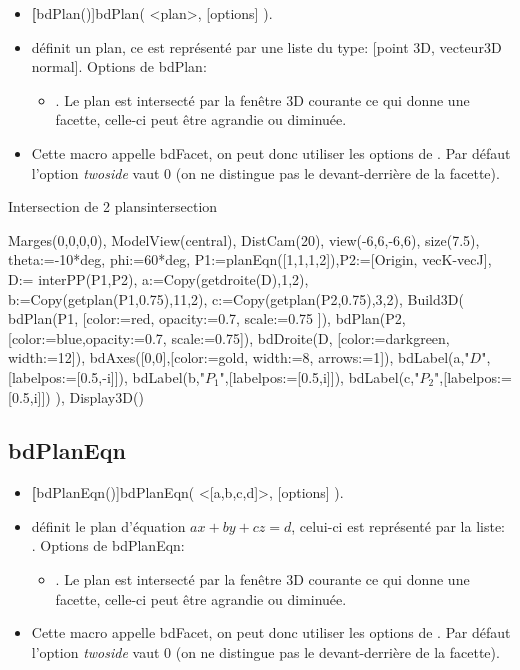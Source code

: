 \begin{itemize}
 \item \util \textbf[bdPlan()]{bdPlan( <plan>, [options] )}.
 \item \desc définit un plan, ce  est représenté par une liste du type: [point 3D, vecteur3D normal]. Options de bdPlan: 

  \begin{itemize}
  \item {}. Le plan est intersecté par la fenêtre 3D courante ce qui donne une facette, celle-ci peut être agrandie ou diminuée.
  \end{itemize}
 \item Cette macro appelle bdFacet, on peut donc utiliser les options de . Par défaut l'option \textit{twoside} vaut 0 (on ne distingue pas le devant-derrière de la facette).
\end{itemize}

\begin{demo}{Intersection de 2 plans}{intersection}
\begin{texgraph}[name=intersection]
Marges(0,0,0,0), ModelView(central), DistCam(20),
view(-6,6,-6,6), size(7.5),
theta:=-10*deg, phi:=60*deg,
P1:=planEqn([1,1,1,2]),P2:=[Origin, vecK-vecJ],
D:= interPP(P1,P2),
a:=Copy(getdroite(D),1,2),
b:=Copy(getplan(P1,0.75),11,2),
c:=Copy(getplan(P2,0.75),3,2),
Build3D( 
 bdPlan(P1, [color:=red, opacity:=0.7,
        scale:=0.75 ]),
 bdPlan(P2, [color:=blue,opacity:=0.7,
       scale:=0.75]),
 bdDroite(D, [color:=darkgreen, 
        width:=12]),
 bdAxes([0,0],[color:=gold, 
        width:=8, arrows:=1]),
 bdLabel(a,"$D$",[labelpos:=[0.5,-i]]),
 bdLabel(b,"$P_1$",[labelpos:=[0.5,i]]),
 bdLabel(c,"$P_2$",[labelpos:=[0.5,i]])
     ),
Display3D() 
\end{texgraph}
\end{demo}

\subsection{bdPlanEqn}

\begin{itemize}
 \item \util \textbf[bdPlanEqn()]{bdPlanEqn( <[a,b,c,d]>, [options] )}.
 \item \desc définit le plan d'équation $ax+by+cz=d$, celui-ci est représenté par la liste: \argu{[a,b,c,d]}. Options de bdPlanEqn: 

  \begin{itemize}
  \item {}. Le plan est intersecté par la fenêtre 3D courante ce qui donne une facette, celle-ci peut être agrandie ou diminuée.
  \end{itemize}
 \item Cette macro appelle bdFacet, on peut donc utiliser les options de . Par défaut l'option \textit{twoside} vaut 0 (on ne distingue pas le devant-derrière de la facette).
\end{itemize}


